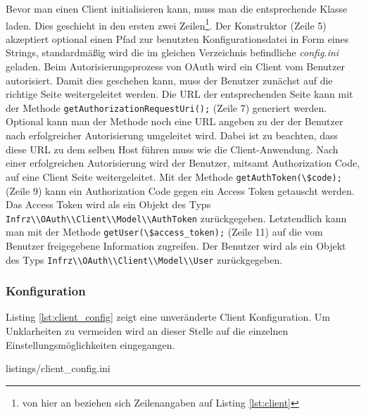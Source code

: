 \documentclass[12pt,a4paper,pointednumbers,abstracton]{scrartcl}
\newcommand{\code}[1]{\small\lstinline[style=InlinePHP]!#1!\normalsize}
\begin{document}
Bevor man einen Client initialisieren kann, muss man die entsprechende Klasse laden.
Dies geschieht in den ersten zwei Zeilen\footnote{von hier an beziehen sich Zeilenangaben auf Listing \ref{lst:client}}.
Der Konstruktor (Zeile 5) akzeptiert optional einen Pfad zur benutzten Konfigurationsdatei in Form eines Strings, standardmäßig wird die im gleichen Verzeichnis befindliche \emph{config.ini} geladen.
Beim Autorisierungsprozess von OAuth wird ein Client vom Benutzer autorisiert.
Damit dies geschehen kann, muss der Benutzer zunächst auf die richtige Seite weitergeleitet werden.
Die URL der entsprechenden Seite kann mit der Methode \code{getAuthorizationRequestUri();} (Zeile 7) generiert werden.
Optional kann man der Methode noch eine URL angeben zu der der Benutzer nach erfolgreicher Autorisierung umgeleitet wird.
Dabei ist zu beachten, dass diese URL zu dem selben Host führen muss wie die Client-Anwendung.
Nach einer erfolgreichen Autorisierung wird der Benutzer, mitsamt Authorization Code, auf eine Client Seite weitergeleitet.
Mit der Methode \code{getAuthToken(\$code);} (Zeile 9) kann ein Authorization Code gegen ein Access Token getauscht werden.
Das Access Token wird als ein Objekt des Typs \code{Infrz\\OAuth\\Client\\Model\\AuthToken} zurückgegeben.
Letztendlich kann man mit der Methode \code{getUser(\$access_token);} (Zeile 11) auf die vom Benutzer freigegebene Information zugreifen.
Der Benutzer wird als ein Objekt des Typs \code{Infrz\\OAuth\\Client\\Model\\User} zurückgegeben.

\subsubsection{Konfiguration}

Listing \ref{lst:client_config} zeigt eine unveränderte Client Konfiguration.
Um Unklarheiten zu vermeiden wird an dieser Stelle auf die einzelnen Einstellungsmöglichkeiten eingegangen.

\begin{minipage}{\textwidth}
	
	{listings/client_config.ini}
\end{minipage}
\end{document}
